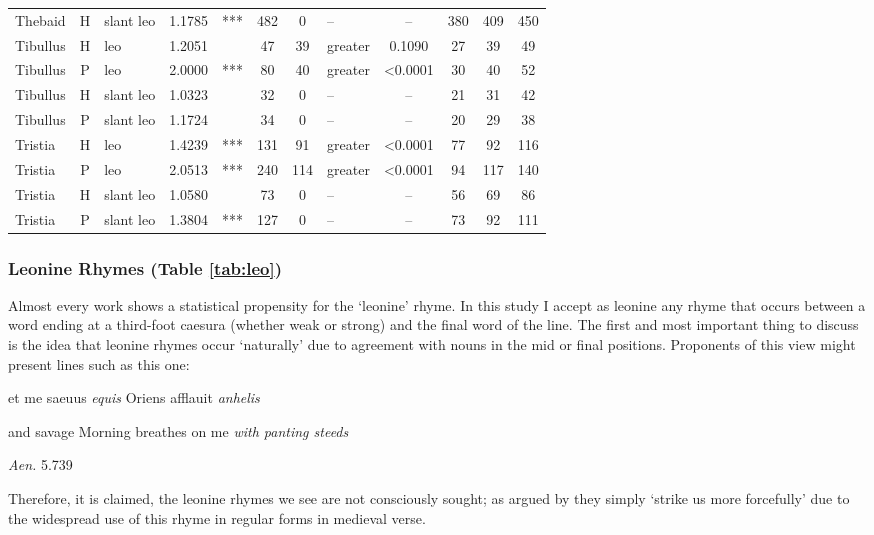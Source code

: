 \documentclass[twocolumn, switch]{article} %
\begin{document}
\begin{table}[h!]
\begin{tabular}{lclcccclcc@{\hspace{1\tabcolsep}}c@{\hspace{1\tabcolsep}}c}
       Thebaid &     H &  slant leo & 1.1785 &   *** &  482 &         0 &        -- & -- &  380 &  409 &  450 \\
      Tibullus &     H &        leo & 1.2051 &       &   47 &        39 &     greater & 0.1090 &   27 &   39 &   49 \\
      Tibullus &     P &        leo & 2.0000 &   *** &   80 &        40 &     greater & <0.0001 &   30 &   40 &   52 \\
      Tibullus &     H &  slant leo & 1.0323 &       &   32 &         0 &        -- & -- &   21 &   31 &   42 \\
      Tibullus &     P &  slant leo & 1.1724 &       &   34 &         0 &        -- & -- &   20 &   29 &   38 \\
       Tristia &     H &        leo & 1.4239 &   *** &  131 &        91 &     greater & <0.0001 &   77 &   92 &  116 \\
       Tristia &     P &        leo & 2.0513 &   *** &  240 &       114 &     greater & <0.0001 &   94 &  117 &  140 \\
       Tristia &     H &  slant leo & 1.0580 &       &   73 &         0 &        -- & -- &   56 &   69 &   86 \\
       Tristia &     P &  slant leo & 1.3804 &   *** &  127 &         0 &        -- & -- &   73 &   92 &  111 \\
  \bottomrule
  \end{tabular}
\end{table}

\subsubsection{Leonine Rhymes (Table \ref{tab:leo})}
\label{sec:leo}

Almost every work shows a statistical propensity for the `leonine' rhyme. In
this study I accept as leonine any rhyme that occurs between a word ending at
a third-foot caesura (whether weak or strong) and the final word of the line.
The first and most important thing to discuss is the idea that leonine rhymes
occur `naturally' due to agreement with nouns in the mid or final positions.
Proponents of this view might present lines such as this one:
\begin{adjustwidth}{0.5cm}{0.5cm}
  et me saeuus \emph{equis} Oriens afflauit \emph{anhelis}

  \noindent and savage Morning breathes on me \emph{with panting steeds}
  \begin{flushright}
    \emph{Aen.} 5.739
  \end{flushright}
\end{adjustwidth}
Therefore, it is claimed, the leonine rhymes we see are not consciously
sought; as argued by  they simply `strike us
more forcefully' due to the widespread use of this rhyme in regular forms in
medieval verse. 
\end{document}
